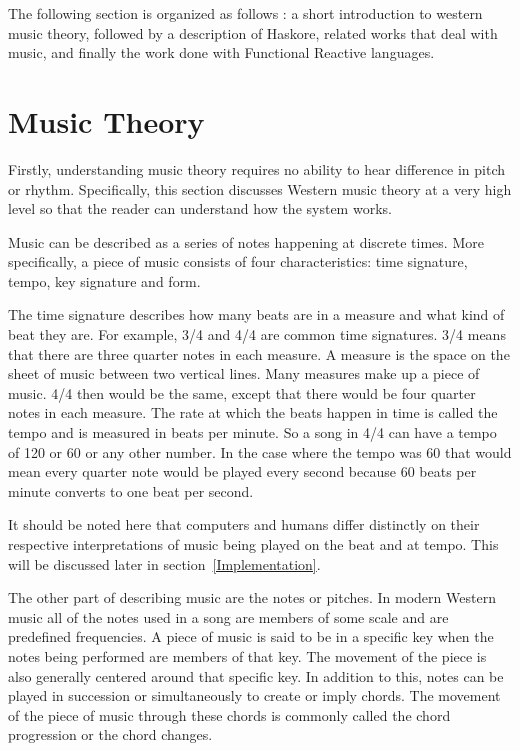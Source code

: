 \documentclass[12pt]{ucthesis}
\begin{document}
The following section is organized as follows : a short introduction to western music theory, followed by a description of Haskore, related works that deal with music, and finally the work done with Functional Reactive languages.

\section{Music Theory}
\label{rw:music-theory}

Firstly, understanding music theory requires no ability to hear difference in pitch or rhythm. Specifically, this section discusses Western music theory at a very high level so that the reader can understand how the system works. 

Music can be described as a series of notes happening at discrete times. More specifically, a piece of music consists of four characteristics: time signature, tempo, key signature and form.

The time signature describes how many beats are in a measure and what kind of beat they are. For example, 3/4 and 4/4 are common time signatures. 3/4 means that there are three quarter notes in each measure. A measure is the space on the sheet of music between two vertical lines. Many measures make up a piece of music. 4/4 then would be the same, except that there would be four quarter notes in each measure. The rate at which the beats happen in time is called the tempo and is measured in beats per minute. So a song in 4/4 can have a tempo of 120 or 60 or any other number. In the case where the tempo was 60 that would mean every quarter note would be played every second because 60 beats per minute converts to one beat per second. 

It should be noted here that computers and humans differ distinctly on their respective interpretations of music being played on the beat and at tempo. This will be discussed later in section~\ref{Implementation}.

The other part of describing music are the notes or pitches. In modern Western music all of the notes used in a song are members of some scale and are predefined frequencies. A piece of music is said to be in a specific key when the notes being performed are members of that key. The movement of the piece is also generally centered around that specific key. In addition to this, notes can be played in succession or simultaneously to create or imply chords. The movement of the piece of music through these chords is commonly called the chord progression or the chord changes. 
\end{document}
